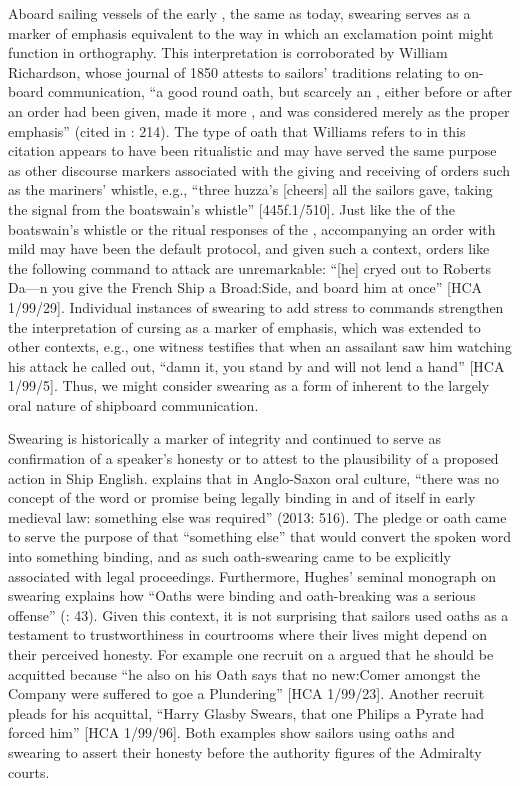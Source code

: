 Aboard sailing vessels of the early , the same as today, swearing serves as a marker of emphasis equivalent to the way in which an exclamation point might function in orthography. This interpretation is corroborated by William Richardson, whose journal of 1850 attests to sailors’ traditions relating to on-board communication, “a good round oath, but scarcely an , either before or after an order had been given, made it more , and was considered merely as the proper emphasis” (cited in \citealt{AdkinsAdkins2008}: 214). The type of oath that Williams refers to in this citation appears to have been ritualistic and may have served the same purpose as other discourse markers associated with the giving and receiving of orders such as the mariners’ whistle, e.g., “three huzza’s [cheers] all the sailors gave, taking the signal from the boatswain’s whistle” [445f.1/510]. Just like the  of the boatswain’s whistle or the ritual responses of the , accompanying an order with mild  may have been the default protocol, and given such a context, orders like the following command to attack are unremarkable: “[he] cryed out to Roberts Da—n you give the French Ship a Broad:Side, and board him at once” [HCA 1/99/29]. Individual instances of swearing to add  stress to commands strengthen the interpretation of cursing as a marker of emphasis, which was extended to other contexts, e.g., one witness testifies that when an assailant saw him watching his attack he called out, “damn it, you stand by and will not lend a hand” [HCA 1/99/5]. Thus, we might consider swearing as a form of   inherent to the largely oral nature of shipboard communication. 

Swearing is historically a marker of integrity and continued to serve as confirmation of a speaker’s honesty or to attest to the plausibility of a proposed action in Ship English. \citeauthor{Ammon2013} explains that in Anglo-Saxon oral culture, “there was no concept of the word or promise being legally binding in and of itself in early medieval law: something else was required” (2013: 516). The pledge or oath came to serve the purpose of that “something else” that would convert the spoken word into something binding, and as such oath-swearing came to be explicitly associated with legal proceedings. Furthermore, Hughes’ seminal monograph on swearing explains how “Oaths were binding and oath-breaking was a serious offense” (\citealt{Hughes1991}: 43). Given this context, it is not surprising that sailors used oaths as a testament to trustworthiness in courtrooms where their lives might depend on their perceived honesty. For example one recruit on a  argued that he should be acquitted because “he also on his Oath says that no new:Comer amongst the Company were suffered to goe a Plundering” [HCA 1/99/23]. Another recruit pleads for his acquittal, “Harry Glasby Swears, that one Philips a Pyrate had forced him” [HCA 1/99/96]. Both examples show sailors using oaths and swearing to assert their honesty before the authority figures of the Admiralty courts. 


